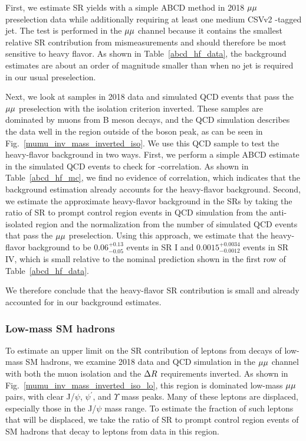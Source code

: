 First, we estimate SR yields with a simple ABCD method in 2018 ${\mu}{\mu}$ preselection data while additionally requiring at least one medium CSVv2 \PQb-tagged jet. The test is performed in the ${\mu}{\mu}$ channel because it contains the smallest relative SR contribution from mismeasurements and should therefore be most sensitive to heavy flavor. As shown in Table~\ref{abcd_hf_data}, the background estimates are about an order of magnitude smaller than when no \PQb jet is required in our usual preselection.



Next, we look at samples in 2018 data and simulated QCD events that pass the ${\mu}{\mu}$ preselection with the isolation criterion inverted. These samples are dominated by muons from B meson decays, and the QCD simulation describes the data well in the region outside of the \PZ boson peak, as can be seen in Fig.~\ref{mumu_inv_mass_inverted_iso}. We use this QCD sample to test the heavy-flavor background in two ways. First, we perform a simple ABCD estimate in the simulated QCD events to check for \ada-\adb correlation. As shown in Table~\ref{abcd_hf_mc}, we find no evidence of correlation, which indicates that the background estimation already accounts for the heavy-flavor background. Second, we estimate the approximate heavy-flavor background in the SRs by taking the ratio of SR to prompt control region events in QCD simulation from the anti-isolated region and the normalization from the number of simulated QCD events that pass the ${\mu}{\mu}$ preselection. Using this approach, we estimate that the heavy-flavor background to be $0.06^{+0.13}_{-0.05}$ events in SR I and $0.0015^{+0.0034}_{-0.0012}$ events in SR IV, which is small relative to the nominal prediction shown in the first row of Table~\ref{abcd_hf_data}.




We therefore conclude that the heavy-flavor SR contribution is small and already accounted for in our background estimates.

\subsubsection{Low-mass SM hadrons}
To estimate an upper limit on the SR contribution of leptons from decays of low-mass SM hadrons, we examine 2018 data and QCD simulation in the ${\mu}{\mu}$ channel with both the muon isolation and the $\Delta R$ requirements inverted. As shown in Fig.~\ref{mumu_inv_mass_inverted_iso_lo}, this region is dominated low-mass ${\mu}{\mu}$ pairs, with clear J/$\psi$, $\psi^\prime$, and $\Upsilon$ mass peaks. Many of these leptons are displaced, especially those in the J/$\psi$ mass range. To estimate the fraction of such leptons that will be displaced, we take the ratio of SR to prompt control region events of SM hadrons that decay to leptons from data in this region.

